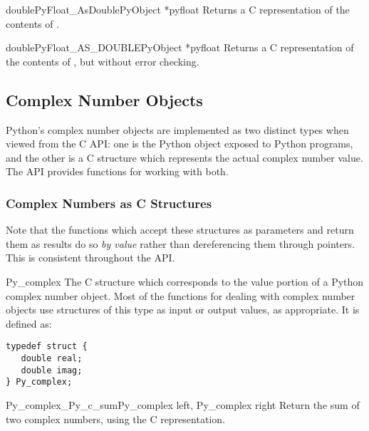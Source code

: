 \begin{cfuncdesc}{double}{PyFloat_AsDouble}{PyObject *pyfloat}
  Returns a C  representation of the contents of
  .
\end{cfuncdesc}

\begin{cfuncdesc}{double}{PyFloat_AS_DOUBLE}{PyObject *pyfloat}
  Returns a C  representation of the contents of
  , but without error checking.
\end{cfuncdesc}


\subsection{Complex Number Objects \label{complexObjects}}

Python's complex number objects are implemented as two distinct types
when viewed from the C API:  one is the Python object exposed to
Python programs, and the other is a C structure which represents the
actual complex number value.  The API provides functions for working
with both.

\subsubsection{Complex Numbers as C Structures}

Note that the functions which accept these structures as parameters
and return them as results do so \emph{by value} rather than
dereferencing them through pointers.  This is consistent throughout
the API.

\begin{ctypedesc}{Py_complex}
  The C structure which corresponds to the value portion of a Python
  complex number object.  Most of the functions for dealing with
  complex number objects use structures of this type as input or
  output values, as appropriate.  It is defined as:

\begin{verbatim}
typedef struct {
   double real;
   double imag;
} Py_complex;
\end{verbatim}
\end{ctypedesc}

\begin{cfuncdesc}{Py_complex}{_Py_c_sum}{Py_complex left, Py_complex right}
  Return the sum of two complex numbers, using the C
   representation.
\end{cfuncdesc}

